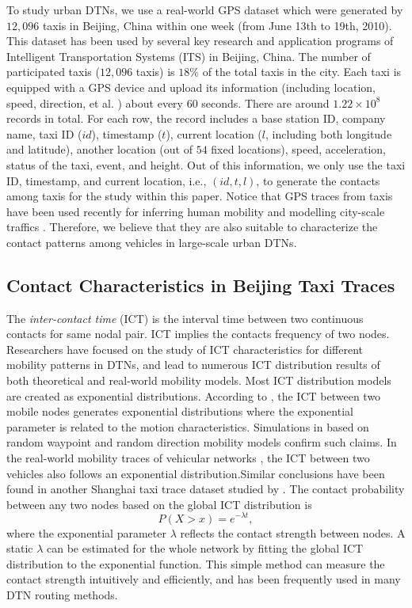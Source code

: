 \documentclass[conference]{IEEEtran}
\begin{document}
To study urban DTNs, we use a real-world GPS dataset  which were generated by $12,096$ taxis in Beijing, China within one week (from June 13th to 19th, 2010). This dataset has been used by several key research and application programs of Intelligent Transportation Systems (ITS) in Beijing, China. The number of participated taxis ($12,096$ taxis) is $18\%$ of the total taxis in the city. Each taxi is equipped with a GPS device and upload its information (including location, speed, direction, et al. ) about every 60 seconds. There are around $1.22 \times 10^8$ records in total.
For each row, the record includes a base station ID, company name, taxi ID ($id$), timestamp ($t$), current location ($l$, including both longitude and latitude), another location (out of $54$ fixed locations), speed, acceleration, status of the taxi, event, and height. Out of this information, we only use the taxi ID, timestamp, and current location, i.e., $(id,t,l)$,  to generate the contacts among taxis for the study within this paper.  Notice that GPS traces from taxis have been used recently for inferring human mobility \cite{Ganti:2013:IHM:2493432.2493466} and modelling city-scale traffics \cite{Aslam:2012:CTE:2426656.2426671}. Therefore, we believe that they are also suitable to characterize the contact patterns among vehicles in large-scale urban DTNs.

\subsection{Contact Characteristics in Beijing Taxi Traces}
\label{Contact Characteristics}

The \emph{inter-contact time} (ICT) is the interval time between two continuous contacts for same nodal pair. ICT implies the contacts frequency of two nodes. Researchers have focused on the study of ICT characteristics for different mobility patterns in DTNs, and lead to numerous ICT distribution results of both theoretical and real-world mobility models. Most ICT distribution models are created as exponential distributions. According to \cite{qGroeneveltNain-18,vHuWang-23,yJiangLi-26} , the ICT between two mobile nodes generates exponential distributions where the exponential parameter is related to the motion characteristics. Simulations in \cite{qGroeneveltNain-18,z20102212975997} based on random waypoint and random direction mobility models confirm such claims.
In the real-world mobility traces of vehicular networks \cite{zaZhuLi-28}, the ICT between two vehicles also follows an exponential distribution.Similar conclusions have been found in another Shanghai taxi trace dataset studied by  \cite{zaZhuLi-28,zb20080311017302}. The contact probability between any two nodes based on the global ICT distribution is
 \begin{equation}
    P(X>x)=e^{-\lambda t},
 \end{equation}
where the exponential parameter $\lambda$ reflects the contact strength between nodes. A static $\lambda$ can be estimated for the whole network by fitting the global ICT distribution to the exponential function. This simple method can measure the contact strength intuitively and efficiently, and has been frequently used in many DTN routing methods.
\end{document}
